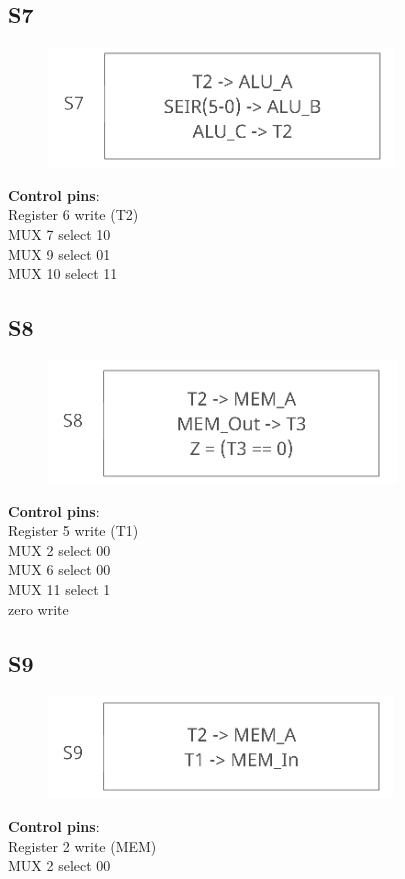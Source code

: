 \documentclass[11pt, fleqn]{article}
\begin{document}
\subsection*{S7}
\begin{figure}[H]
    \centering
    \includegraphics{DataPath/DataPath_S7.PNG}
\end{figure}
\textbf{Control pins}: \\
Register 6 write (T2) \\
MUX 7 select 10 \\
MUX 9 select 01 \\
MUX 10 select 11 \\

\subsection*{S8}
\begin{figure}[H]
    \centering
    \includegraphics{DataPath/DataPath_S8.PNG}
\end{figure}
\textbf{Control pins}: \\
Register 5 write (T1) \\
MUX 2 select 00 \\
MUX 6 select 00 \\
MUX 11 select 1 \\
zero write \\

\subsection*{S9}
\begin{figure}[H]
    \centering
    \includegraphics{DataPath/DataPath_S9.PNG}
\end{figure}
\textbf{Control pins}: \\
Register 2 write (MEM) \\
MUX 2 select 00 \\
\end{document}
